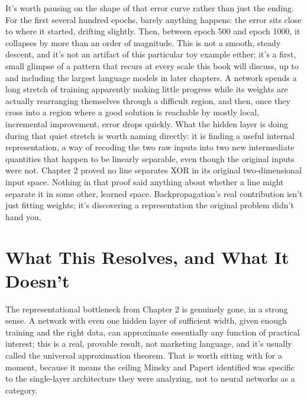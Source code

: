 It's worth pausing on the shape of that error curve rather than just the ending. For the first several hundred epochs, barely anything happens: the error sits close to where it started, drifting slightly. Then, between epoch 500 and epoch 1000, it collapses by more than an order of magnitude. This is not a smooth, steady descent, and it's not an artifact of this particular toy example either; it's a first, small glimpse of a pattern that recurs at every scale this book will discuss, up to and including the largest language models in later chapters. A network spends a long stretch of training apparently making little progress while its weights are actually rearranging themselves through a difficult region, and then, once they cross into a region where a good solution is reachable by mostly local, incremental improvement, error drops quickly. What the hidden layer is doing during that quiet stretch is worth naming directly: it is finding a useful internal representation, a way of recoding the two raw inputs into two new intermediate quantities that happen to be linearly separable, even though the original inputs were not. Chapter 2 proved no line separates XOR in its original two-dimensional input space. Nothing in that proof said anything about whether a line might separate it in some other, learned space. Backpropagation's real contribution isn't just fitting weights; it's discovering a representation the original problem didn't hand you.

\section*{What This Resolves, and What It Doesn't}

The representational bottleneck from Chapter 2 is genuinely gone, in a strong sense. A network with even one hidden layer of sufficient width, given enough training and the right data, can approximate essentially any function of practical interest; this is a real, provable result, not marketing language, and it's usually called the universal approximation theorem. That is worth sitting with for a moment, because it means the ceiling Minsky and Papert identified was specific to the single-layer architecture they were analyzing, not to neural networks as a category.

